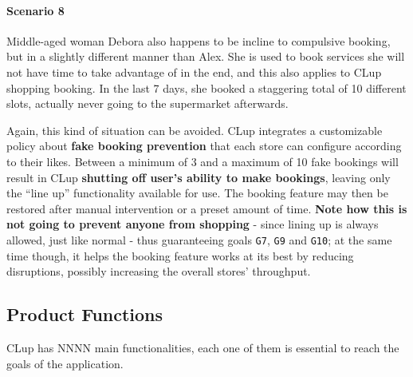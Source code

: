 \paragraph{Scenario 8}

Middle-aged woman Debora also happens to be incline to \guillemotleft compulsive booking\guillemotright, but in a slightly different manner than Alex. \newline
She is used to book services she will not have time to take advantage of in the end, and this also applies to CLup shopping booking. In the last 7 days, she booked a staggering total of 10 different slots, actually never going to the supermarket afterwards.

Again, this kind of situation can be avoided. CLup integrates a customizable policy about \textbf{fake booking prevention} that each store can configure according to their likes. \newline
Between a minimum of 3 and a maximum of 10 fake bookings will result in CLup \textbf{shutting off user's ability to make bookings}, leaving only the ``line up'' functionality available for use. The booking feature may then be restored after manual intervention or a preset amount of time. \newline
\textbf{Note how this is not going to prevent anyone from shopping} - since lining up is always allowed, just like normal - thus guaranteeing goals \texttt{G7}, \texttt{G9} and \texttt{G10}; at the same time though, it helps the booking feature works at its best by reducing disruptions, possibly increasing the overall stores' throughput.

\subsection{Product Functions}
CLup has NNNN main functionalities, each one of them is essential to reach the goals of the application.\\

